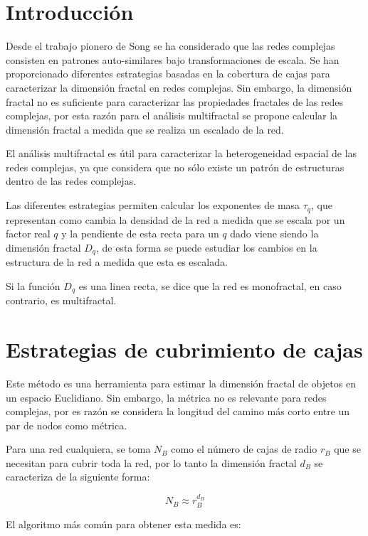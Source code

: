 \section{Introducción}

Desde el trabajo pionero de Song\cite{Song2005} se ha considerado que las redes complejas consisten en patrones auto-similares bajo transformaciones de escala. Se han proporcionado diferentes estrategias basadas en la cobertura de cajas para caracterizar la dimensión fractal en redes complejas. Sin embargo, la dimensión fractal no es suficiente para caracterizar las propiedades fractales de las redes complejas, por esta razón para el análisis multifractal se propone calcular la dimensión fractal a medida que se realiza un escalado de la red.

El análisis multifractal es útil para caracterizar la heterogeneidad espacial de las redes complejas, ya que considera que no sólo existe un patrón de estructuras dentro de las redes complejas.

Las diferentes estrategias permiten calcular los exponentes de masa $\tau_q$, que representan como cambia la densidad de la red a medida que se escala por un factor real $q$ y la pendiente de esta recta para un $q$ dado viene siendo la dimensión fractal $D_q$, de esta forma se puede estudiar los cambios en la estructura de la red a medida que esta es escalada.

Si la función $D_q$ es una linea recta, se dice que la red es monofractal, en caso contrario, es multifractal.

\section{Estrategias de cubrimiento de cajas}

Este método es una herramienta para estimar la dimensión fractal de objetos en un espacio Euclidiano. Sin embargo, la métrica no es relevante para redes complejas, por es razón se considera la longitud del camino más corto entre un par de nodos como métrica. 

Para una red cualquiera, se toma $N_B$ como el número de cajas de radio $r_B$ que se necesitan para cubrir toda la red, por lo tanto la dimensión fractal $d_B$ se caracteriza de la siguiente forma:

\begin{equation}
    N_B \approx r_B^{d_B}
\end{equation}

El algoritmo más común para obtener esta medida es:


